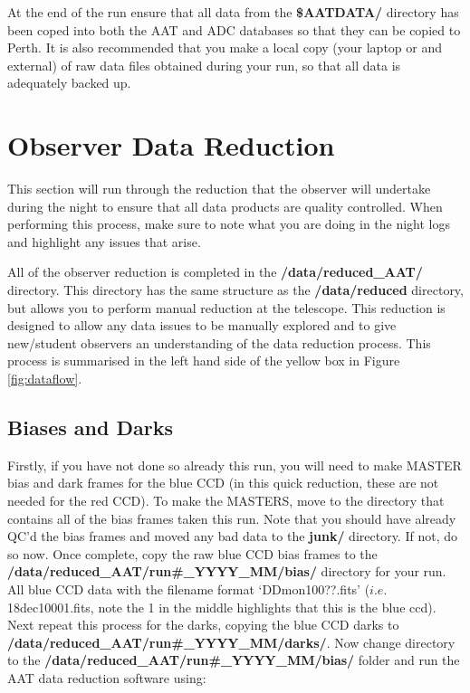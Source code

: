 \documentclass[12pt]{article}
\begin{document}
At the end of the run ensure that all data from the \textbf{\$AATDATA/} directory has been coped into both the AAT and ADC databases so that they can be copied to Perth. It is also recommended that you make a local copy (your laptop or and external) of raw data files obtained during your run, so that all data is adequately backed up.  

\section{Observer Data Reduction}
\label{sec:Reduc}

This section will run through the reduction that the observer will undertake during the night to ensure that all data products are quality controlled. When performing this process, make sure to note what you are doing in the night logs and highlight any issues that arise.

All of the observer reduction is completed in the \textbf{/data/reduced\_AAT/} directory. This directory has the same structure as the \textbf{/data/reduced} directory, but allows you to perform manual reduction at the telescope. This reduction is designed to allow any data issues to be manually explored and to give new/student observers an understanding of the data reduction process. This process is summarised in the left hand side of the yellow box in Figure \ref{fig:dataflow}.   

\subsection{Biases and Darks}

Firstly, if you have not done so already this run,  you will need to make MASTER bias and dark frames for the blue CCD (in this quick reduction, these are not needed for the red CCD). To make the MASTERS, move to the directory that contains all of the bias frames taken this run. Note that you should have already QC'd the bias frames and moved any bad data to the \textbf{junk/} directory.  If not, do so now. Once complete, copy the raw blue CCD bias frames to the \textbf{/data/reduced\_AAT/run\#\_YYYY\_MM/bias/} directory for your run. All blue CCD data with the filename format `DDmon100??.fits' ($i.e.$ 18dec10001.fits, note the 1 in the middle highlights that this is the blue ccd). Next repeat this process for the darks, copying the blue CCD darks to \textbf{/data/reduced\_AAT/run\#\_YYYY\_MM/darks/}. Now change directory to the \textbf{/data/reduced\_AAT/run\#\_YYYY\_MM/bias/} folder and run the AAT data reduction software using: \\
\end{document}
